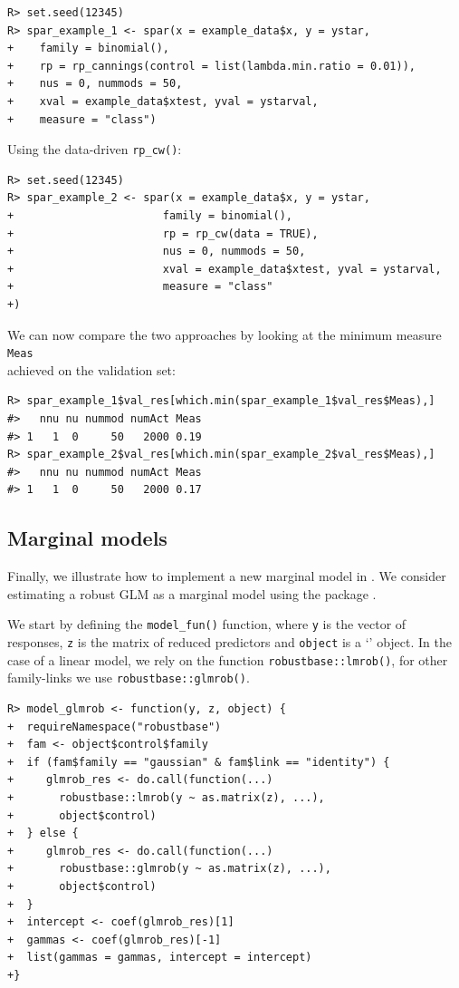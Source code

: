 \documentclass[
  article,
  nojss]{jss}
\newcommand{\class}[1]{`\code{#1}'}
\begin{document}
\begin{verbatim}
R> set.seed(12345) 
R> spar_example_1 <- spar(x = example_data$x, y = ystar,
+    family = binomial(),
+    rp = rp_cannings(control = list(lambda.min.ratio = 0.01)),
+    nus = 0, nummods = 50, 
+    xval = example_data$xtest, yval = ystarval,
+    measure = "class")
\end{verbatim}

Using the data-driven \texttt{rp\_cw()}:

\begin{verbatim}
R> set.seed(12345)  
R> spar_example_2 <- spar(x = example_data$x, y = ystar,
+                       family = binomial(),
+                       rp = rp_cw(data = TRUE),
+                       nus = 0, nummods = 50, 
+                       xval = example_data$xtest, yval = ystarval,
+                       measure = "class"
+)
\end{verbatim}

We can now compare the two approaches by looking at the minimum measure
\texttt{Meas}\\
achieved on the validation set:

\begin{verbatim}
R> spar_example_1$val_res[which.min(spar_example_1$val_res$Meas),]
#>   nnu nu nummod numAct Meas
#> 1   1  0     50   2000 0.19
R> spar_example_2$val_res[which.min(spar_example_2$val_res$Meas),]
#>   nnu nu nummod numAct Meas
#> 1   1  0     50   2000 0.17
\end{verbatim}

\subsection{Marginal models}\label{marginal-models-1}

Finally, we illustrate how to implement a new marginal model in
. We consider estimating a robust GLM as a marginal model
using the package  \citep{pkg:robustbase}.

We start by defining the \texttt{model\_fun()} function, where
\texttt{y} is the vector of responses, \texttt{z} is the matrix of
reduced predictors and \texttt{object} is a \class{sparmodel} object. In
the case of a linear model, we rely on the function
\texttt{robustbase::lmrob()}, for other family-links we use
\texttt{robustbase::glmrob()}.

\begin{verbatim}
R> model_glmrob <- function(y, z, object) {
+  requireNamespace("robustbase")
+  fam <- object$control$family
+  if (fam$family == "gaussian" & fam$link == "identity") {
+     glmrob_res <- do.call(function(...) 
+       robustbase::lmrob(y ~ as.matrix(z), ...),
+       object$control)
+  } else {
+     glmrob_res <- do.call(function(...) 
+       robustbase::glmrob(y ~ as.matrix(z), ...),
+       object$control) 
+  }
+  intercept <- coef(glmrob_res)[1]
+  gammas <- coef(glmrob_res)[-1]
+  list(gammas = gammas, intercept = intercept)
+}
\end{verbatim}
\end{document}
